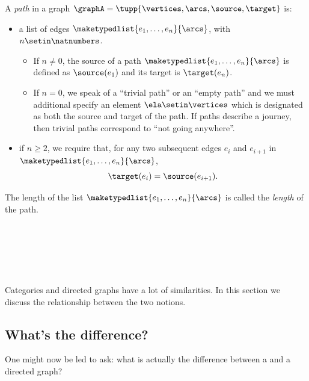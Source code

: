 \begin{ctdefinition}[Paths]
    \label{def:path}
    A \emph{path} in a graph $\graphA=\tupp{\vertices,\arcs, \source,\target}$ is:

    \constit

    \begin{itemize}
        \item a list of edges $\maketypedlist{e_1, \dots, e_n}{\arcs}$, with $n \setin \natnumbers$.
              \begin{itemize}
                  \item If $n \neq 0$, the source of a path $\maketypedlist{e_1, \dots, e_n}{\arcs}$ is defined as $\source(e_1)$ and its target is $\target(e_n)$.
                  \item If $n = 0$, we speak of a ``trivial path'' or an ``empty path'' and we must additional specify an element $\ela \setin \vertices$ which is designated as both the source and target of the path.
                        If paths describe a journey, then trivial paths correspond to ``not going anywhere''.
              \end{itemize}
    \end{itemize}

    \condit

    \begin{itemize}
        \item if $n \geq 2$, we require that, for any two subsequent edges $e_i$ and $e_{i+1}$ in $\maketypedlist{e_1, \dots, e_n}{\arcs}$,
              \begin{equation}
                  \target(e_i) = \source(e_{i+1}).
              \end{equation}
    \end{itemize}
    The length of the list $\maketypedlist{e_1, \dots, e_n}{\arcs}$ is called the \emph{length} of the path.
\end{ctdefinition}

\ 

\ 

\

Categories and directed graphs have a lot of similarities. In this section we discuss the relationship between the two notions. 

\subsection{What's the difference?}

One might now be led to ask: what is actually the difference between a  and a directed graph?

